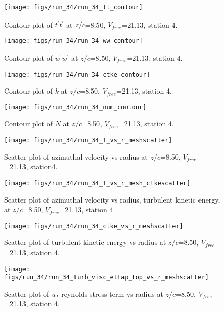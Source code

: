 \begin{figure}[H]
\centering
\texttt{[image: figs/run\_34/run\_34\_tt\_contour]}
\caption{Contour plot of $\overline{t^\prime t^\prime}$ at $z/c$=8.50, $V_{free}$=21.13, station 4.}
\end{figure}


\begin{figure}[H]
\centering
\texttt{[image: figs/run\_34/run\_34\_ww\_contour]}
\caption{Contour plot of $\overline{w^\prime w^\prime}$ at $z/c$=8.50, $V_{free}$=21.13, station 4.}
\end{figure}


\begin{figure}[H]
\centering
\texttt{[image: figs/run\_34/run\_34\_ctke\_contour]}
\caption{Contour plot of $k$ at $z/c$=8.50, $V_{free}$=21.13, station 4.}
\end{figure}


\begin{figure}[H]
\centering
\texttt{[image: figs/run\_34/run\_34\_num\_contour]}
\caption{Contour plot of $N$ at $z/c$=8.50, $V_{free}$=21.13, station 4.}
\end{figure}


\begin{figure}[H]
\centering
\texttt{[image: figs/run\_34/run\_34\_T\_vs\_r\_meshscatter]}
\caption{Scatter plot of azimuthal velocity vs radius at $z/c$=8.50, $V_{free}$=21.13, station4.}
\end{figure}


\begin{figure}[H]
\centering
\texttt{[image: figs/run\_34/run\_34\_T\_vs\_r\_mesh\_ctkescatter]}
\caption{Scatter plot of azimuthal velocity vs radius, turbulent kinetic energy, at $z/c$=8.50, $V_{free}$=21.13, station 4.}
\end{figure}


\begin{figure}[H]
\centering
\texttt{[image: figs/run\_34/run\_34\_ctke\_vs\_r\_meshscatter]}
\caption{Scatter plot of turbulent kinetic energy vs radius at $z/c$=8.50, $V_{free}$=21.13, station 4.}
\end{figure}


\begin{figure}[H]
\centering
\texttt{[image: figs/run\_34/run\_34\_turb\_visc\_ettap\_top\_vs\_r\_meshscatter]}
\caption{Scatter plot of $
u_T$ reynolds stress term vs radius at $z/c$=8.50, $V_{free}$=21.13, station 4.}
\end{figure}


